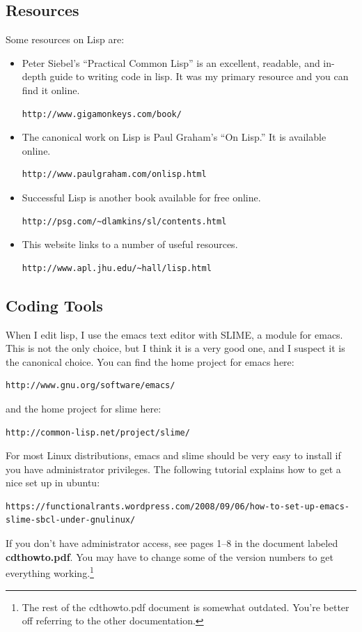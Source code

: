 \documentclass[12pt]{article}
\begin{document}
\subsection{Resources}
Some resources on Lisp are:
\begin{itemize}
\item Peter Siebel's ``Practical Common Lisp'' is an excellent,
  readable, and in-depth guide to writing code in lisp. It was my
  primary resource and you can find it online.
  \begin{verbatim}
http://www.gigamonkeys.com/book/
\end{verbatim}
\item The canonical work on Lisp is Paul Graham's ``On Lisp.'' It is available online.
\begin{verbatim}
http://www.paulgraham.com/onlisp.html
\end{verbatim}
\item Successful Lisp is another book available for free online.
\begin{verbatim}
http://psg.com/~dlamkins/sl/contents.html
\end{verbatim}
\item This website links to a number of useful resources.
  \begin{verbatim}
http://www.apl.jhu.edu/~hall/lisp.html
\end{verbatim}
\end{itemize}
\subsection{Coding Tools}
\label{s:lisp:tools}
When I edit lisp, I use the emacs text editor with SLIME, a module for
emacs. This is not the only choice, but I think it is a very good one,
and I suspect it is the canonical choice. You can find the home
project for emacs here:
\begin{verbatim}
http://www.gnu.org/software/emacs/
\end{verbatim}
and the home project for slime here:
\begin{verbatim}
http://common-lisp.net/project/slime/
\end{verbatim}
For most Linux distributions, emacs and slime should be very easy to
install if you have administrator privileges. The following tutorial explains how to get a nice set up in ubuntu:
\begin{footnotesize}
\begin{verbatim}
https://functionalrants.wordpress.com/2008/09/06/how-to-set-up-emacs-slime-sbcl-under-gnulinux/
\end{verbatim}
\end{footnotesize}
If you don't have administrator access, see pages 1--8 in the document
labeled \textbf{cdthowto.pdf}. You may have to change some of the
version numbers to get everything working.\footnote{The rest of the
  cdthowto.pdf document is somewhat outdated. You're better off
  referring to the other documentation.}
\end{document}
